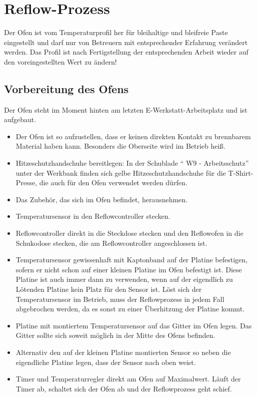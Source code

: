 \documentclass{\basedir/fablab-document}
\begin{document}
\section{Reflow-Prozess}
Der Ofen ist vom Temperaturprofil her für bleihaltige und bleifreie Paste eingestellt und darf nur von Betreuern mit entsprechender Erfahrung verändert werden. Das Profil ist nach Fertigstellung der entsprechenden Arbeit wieder auf den voreingestellten Wert zu ändern!

\subsection{Vorbereitung des Ofens}
Der Ofen steht im Moment hinten am letzten E-Werkstatt-Arbeitsplatz und ist aufgebaut.
\begin{itemize}
	\item Der Ofen ist so aufzustellen, dass er keinen direkten Kontakt zu brennbarem Material haben kann. Besonders die Oberseite wird im Betrieb heiß.
	\item Hitzeschutzhandschuhe bereitlegen: In der Schublade \enquote{ W9 - Arbeitsschutz} unter der Werkbank finden sich gelbe Hitzeschutzhandschuhe für die T-Shirt-Presse, die auch für den Ofen verwendet werden dürfen.
	\item Das Zubehör, das sich im Ofen befindet, herausnehmen.
	\item Temperatursensor in den Reflowcontroller stecken.
	\item Reflowcontroller direkt in die Steckdose stecken und den Reflowofen in die Schukodose stecken, die am Reflowcontroller angeschlossen ist.
	\item Temperatursensor gewissenhaft mit Kaptonband auf der Platine befestigen, sofern er nicht schon auf einer kleinen Platine im Ofen befestigt ist. Diese Platine ist auch immer dann zu verwenden, wenn auf der eigendlich zu Lötenden Platine kein Platz für den Sensor ist. Löst sich der Temperatursensor im Betrieb, muss der Reflowprozess in jedem Fall abgebrochen werden, da es sonst zu einer Überhitzung der Platine kommt.
	\item Platine mit montiertem Temperatursensor auf das Gitter im Ofen legen. Das Gitter sollte sich soweit möglich in der Mitte des Ofens befinden.
	\item Alternativ den auf der kleinen Platine montierten Sensor so neben die eigendliche Platine legen, dass der Sensor nach oben weist.
	\item Timer und Temperaturregler direkt am Ofen auf Maximalwert. Läuft der Timer ab, schaltet sich der Ofen ab und der Reflowprozess geht schief.
\end{itemize}
\end{document}
